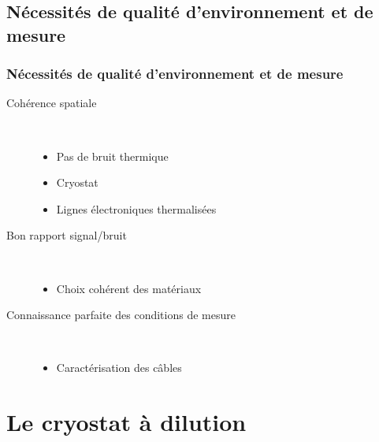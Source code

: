 \documentclass[8pt,a9paper]{beamer} \usepackage[utf8]{inputenc} \usepackage[francais]{babel} \usepackage[T1]{fontenc}
\begin{document}
\subsection{Nécessités de qualité d'environnement et de mesure}
\begin{frame}
\frametitle{Nécessités de qualité d'environnement et de mesure}
\begin{description}
    \item[Cohérence spatiale] ~\\
    \begin{itemize}
        \item Pas de bruit thermique
        \item Cryostat
        \item Lignes électroniques thermalisées
    \end{itemize}
    \item[Bon rapport signal/bruit] ~\\
    \begin{itemize}
        \item Choix cohérent des matériaux
    \end{itemize}
    \item[Connaissance parfaite des conditions de mesure] ~\\
    \begin{itemize}
        \item Caractérisation des câbles
    \end{itemize}
\end{description}
\end{frame}

\section{Le cryostat à dilution}
\end{document}

